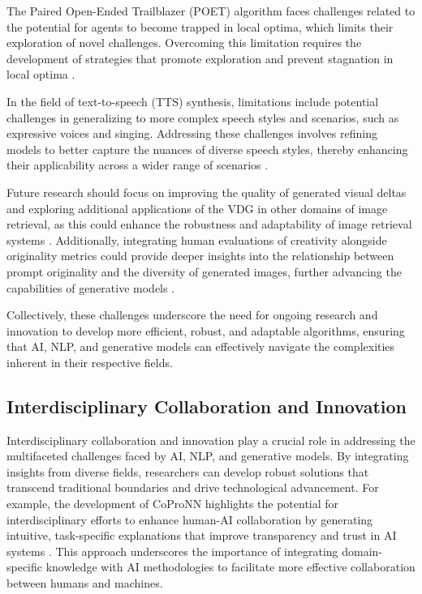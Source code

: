 The Paired Open-Ended Trailblazer (POET) algorithm faces challenges related to the potential for agents to become trapped in local optima, which limits their exploration of novel challenges. Overcoming this limitation requires the development of strategies that promote exploration and prevent stagnation in local optima \cite{wang2019pairedopenendedtrailblazerpoet}.



In the field of text-to-speech (TTS) synthesis, limitations include potential challenges in generalizing to more complex speech styles and scenarios, such as expressive voices and singing. Addressing these challenges involves refining models to better capture the nuances of diverse speech styles, thereby enhancing their applicability across a wider range of scenarios \cite{tan2022naturalspeechendtoendtextspeech}.



Future research should focus on improving the quality of generated visual deltas and exploring additional applications of the VDG in other domains of image retrieval, as this could enhance the robustness and adaptability of image retrieval systems \cite{jang2024visualdeltageneratorlarge}. Additionally, integrating human evaluations of creativity alongside originality metrics could provide deeper insights into the relationship between prompt originality and the diversity of generated images, further advancing the capabilities of generative models \cite{palmini2024patternscreativityuserinput}.



Collectively, these challenges underscore the need for ongoing research and innovation to develop more efficient, robust, and adaptable algorithms, ensuring that AI, NLP, and generative models can effectively navigate the complexities inherent in their respective fields.



\subsection{Interdisciplinary Collaboration and Innovation} \label{subsec:Interdisciplinary Collaboration and Innovation}



Interdisciplinary collaboration and innovation play a crucial role in addressing the multifaceted challenges faced by AI, NLP, and generative models. By integrating insights from diverse fields, researchers can develop robust solutions that transcend traditional boundaries and drive technological advancement. For example, the development of CoProNN highlights the potential for interdisciplinary efforts to enhance human-AI collaboration by generating intuitive, task-specific explanations that improve transparency and trust in AI systems \cite{chiaburu2024copronnconceptbasedprototypicalnearest}. This approach underscores the importance of integrating domain-specific knowledge with AI methodologies to facilitate more effective collaboration between humans and machines.




